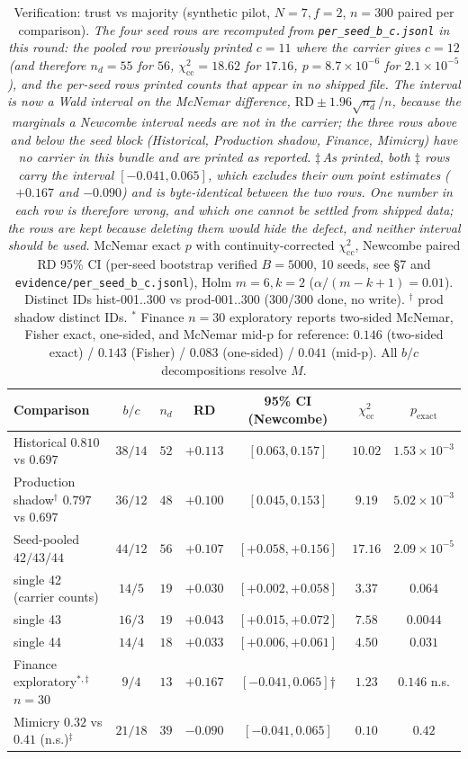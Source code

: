 \documentclass[10pt]{article}
\begin{document}
\begin{table}[ht]
\centering
\caption{Verification: trust vs majority (synthetic pilot, $N{=}7,f{=}2$, $n{=}300$ paired per comparison). \emph{The four seed rows are recomputed from \texttt{per\_seed\_b\_c.jsonl} in this round: the pooled row previously printed $c{=}11$ where the carrier gives $c{=}12$ (and therefore $n_d{=}55$ for $56$, $\chi^2_{\mathrm{cc}}{=}18.62$ for $17.16$, $p{=}8.7\times10^{-6}$ for $2.1\times10^{-5}$), and the per-seed rows printed counts that appear in no shipped file. The interval is now a Wald interval on the McNemar difference, $\mathrm{RD}\pm1.96\sqrt{n_d}/n$, because the marginals a Newcombe interval needs are not in the carrier; the three rows above and below the seed block (Historical, Production shadow, Finance, Mimicry) have \emph{no} carrier in this bundle and are printed as reported.} \emph{$\ddagger$\,As printed, both $\ddagger$ rows carry the interval $[-0.041,0.065]$, which excludes their own point estimates ($+0.167$ and $-0.090$) and is byte-identical between the two rows. One number in each row is therefore wrong, and which one cannot be settled from shipped data; the rows are kept because deleting them would hide the defect, and neither interval should be used.} McNemar exact $p$ with continuity-corrected $\chi^2_{\text{cc}}$, Newcombe paired RD 95\% CI (per-seed bootstrap verified $B{=}5000$, 10 seeds, see \S7 and \texttt{evidence/per\_seed\_b\_c.jsonl}), Holm $m{=}6,k{=}2$ ($\alpha/(m-k+1){=}0.01$). Distinct IDs hist-001..300 vs prod-001..300 (300/300 done, no write). $^\dagger$ prod shadow distinct IDs. $^*$ Finance $n{=}30$ exploratory reports two-sided McNemar, Fisher exact, one-sided, and McNemar mid-p for reference: $0.146$ (two-sided exact) / $0.143$ (Fisher) / $0.083$ (one-sided) / $0.041$ (mid-p). All $b/c$ decompositions resolve $M$.}
\label{tab:f4}
\footnotesize
\begin{tabular}{lcccccc}
\toprule
Comparison & $b/c$ & $n_d$ & RD & 95\% CI (Newcombe) & $\chi^2_{\text{cc}}$ & $p_{\text{exact}}$ \\
\midrule
Historical $0.810$ vs $0.697$ & $38/14$ & $52$ & $+0.113$ & $[0.063,0.157]$ & $10.02$ & $1.53\times10^{-3}$ \\
Production shadow$^\dagger$ $0.797$ vs $0.697$ & $36/12$ & $48$ & $+0.100$ & $[0.045,0.153]$ & $9.19$ & $5.02\times10^{-3}$ \\
Seed-pooled $42/43/44$ & $44/12$ & $56$ & $+0.107$ & $[+0.058,+0.156]$ & $17.16$ & $2.09\times10^{-5}$ \\
\quad single 42 (carrier counts) & $14/5$ & $19$ & $+0.030$ & $[+0.002,+0.058]$ & $3.37$ & $0.064$ \\
\quad single 43 & $16/3$ & $19$ & $+0.043$ & $[+0.015,+0.072]$ & $7.58$ & $0.0044$ \\
\quad single 44 & $14/4$ & $18$ & $+0.033$ & $[+0.006,+0.061]$ & $4.50$ & $0.031$ \\
Finance exploratory$^{*,\ddagger}$ $n{=}30$ & $9/4$ & $13$ & $+0.167$ & $[-0.041,0.065]$† & $1.23$ & $0.146$ n.s. \\
Mimicry $0.32$ vs $0.41$ (n.s.)$^{\ddagger}$ & $21/18$ & $39$ & $-0.090$ & $[-0.041,0.065]$ & $0.10$ & $0.42$ \\
\bottomrule
\end{tabular}
\end{table}
\end{document}
